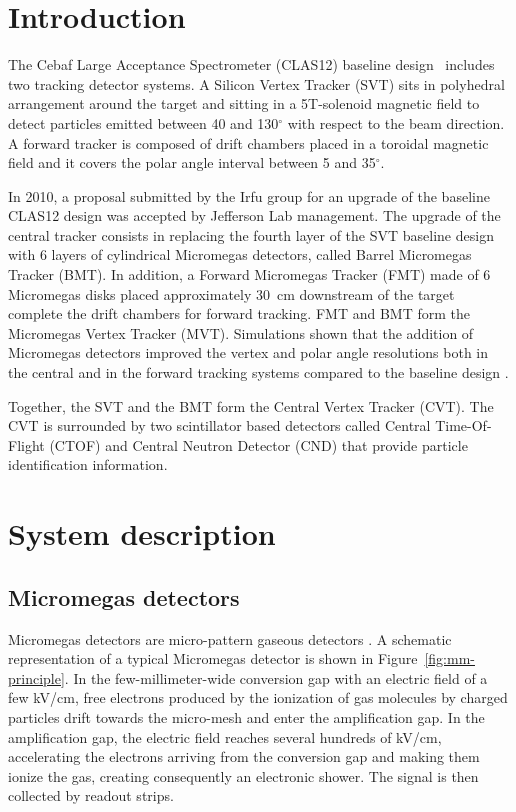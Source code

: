 \section{Introduction}
The Cebaf Large Acceptance Spectrometer (CLAS12) baseline design~\cite{nim:clas12} includes two tracking detector systems. A Silicon Vertex Tracker (SVT) \cite{nim:svt} sits in polyhedral arrangement around the target and sitting in a 5T-solenoid magnetic field to detect particles emitted between 40 and 130$^{\circ}$ with respect to the beam direction. A forward tracker is composed of drift chambers placed in a toroidal magnetic field and it covers the polar angle interval between 5 and 35$^{\circ}$. 

In 2010, a proposal submitted by the Irfu group for an upgrade of the baseline CLAS12 design was accepted by Jefferson Lab management. The upgrade of the central tracker consists in replacing the fourth layer of the SVT baseline design with 6 layers of cylindrical Micromegas detectors, called Barrel Micromegas Tracker (BMT). In addition, a Forward Micromegas Tracker (FMT) made of 6 Micromegas disks placed approximately 30~cm downstream of the target complete the drift chambers for forward tracking. FMT and BMT form the Micromegas Vertex Tracker (MVT). Simulations shown that the addition of Micromegas detectors improved the vertex and polar angle resolutions both in the central and in the forward tracking systems compared to the baseline design \cite{CLAS-NOTE2007-004,CLAS-NOTE2010-003}.

Together, the SVT and the BMT form the Central Vertex Tracker (CVT). The CVT is surrounded by two scintillator based detectors called Central Time-Of-Flight (CTOF) \cite{nim:ctof} and Central Neutron Detector (CND) \cite{nim:cnd} that provide particle identification information.

\section{System description}

\subsection{Micromegas detectors}
Micromegas detectors are micro-pattern gaseous detectors \cite{GIOMATARIS199629}. A schematic representation of a typical Micromegas detector is shown in Figure~\ref{fig:mm-principle}. In the few-millimeter-wide conversion gap with an electric field of a few kV/cm, free electrons produced by the ionization of gas molecules by charged particles drift towards the micro-mesh and enter the amplification gap. In the amplification gap, the electric field reaches several hundreds of kV/cm, accelerating the electrons arriving from the conversion gap and making them ionize the gas, creating consequently an electronic shower. The signal is then collected by readout strips.  

